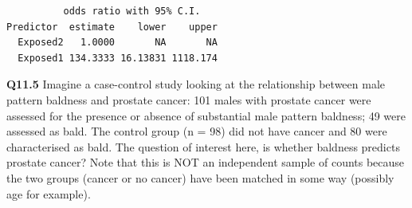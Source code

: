 \documentclass[
  oneside]{krantz}
\newenvironment{Shaded}{\begin{snugshade}}{\end{snugshade}}
\newcommand{\AttributeTok}[1]{\textcolor[rgb]{0.77,0.63,0.00}{#1}}
\newcommand{\CommentTok}[1]{\textcolor[rgb]{0.56,0.35,0.01}{\textit{#1}}}
\newcommand{\DecValTok}[1]{\textcolor[rgb]{0.00,0.00,0.81}{#1}}
\newcommand{\DocumentationTok}[1]{\textcolor[rgb]{0.56,0.35,0.01}{\textbf{\textit{#1}}}}
\newcommand{\FunctionTok}[1]{\textcolor[rgb]{0.00,0.00,0.00}{#1}}
\newcommand{\NormalTok}[1]{#1}
\newcommand{\OtherTok}[1]{\textcolor[rgb]{0.56,0.35,0.01}{#1}}
\newcommand{\SpecialCharTok}[1]{\textcolor[rgb]{0.00,0.00,0.00}{#1}}
\newcommand{\StringTok}[1]{\textcolor[rgb]{0.31,0.60,0.02}{#1}}
\begin{document}
\begin{Shaded}
\end{Shaded}

\begin{verbatim}
          odds ratio with 95% C.I.
Predictor  estimate    lower    upper
  Exposed2   1.0000       NA       NA
  Exposed1 134.3333 16.13831 1118.174
\end{verbatim}

\textbf{Q11.5} Imagine a case-control study looking at the relationship between male pattern baldness and prostate cancer: 101 males with prostate cancer were assessed for the presence or absence of substantial male pattern baldness; 49 were assessed as bald. The control group (n = 98) did not have cancer and 80 were characterised as bald. The question of interest here, is whether baldness predicts prostate cancer? Note that this is NOT an independent sample of counts because the two groups (cancer or no cancer) have been matched in some way (possibly age for example).
\end{document}
